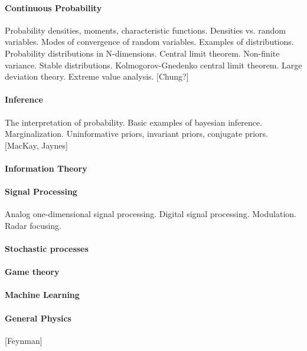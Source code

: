 \paragraph{Continuous Probability}
Probability densities, moments, characteristic functions.
Densities vs. random variables.
Modes of convergence of random variables.
Examples of distributions.
Probability distributions in N-dimensions.
Central limit theorem.
Non-finite variance.  Stable distributions.  Kolmogorov-Gnedenko central
limit theorem.
Large deviation theory.
Extreme value analysis.
[Chung?]


\paragraph{Inference}
The interpretation of probability.
Basic examples of bayesian inference.
Marginalization.
Uninformative priors, invariant priors, conjugate priors.
[MacKay, Jaynes]



\paragraph{Information Theory}

\paragraph {Signal Processing}
Analog one-dimensional signal processing.
Digital signal processing.
Modulation.
Radar focusing.

\paragraph{Stochastic processes}

\paragraph{Game theory}

\paragraph{Machine Learning}



\paragraph{General Physics}
[Feynman]

